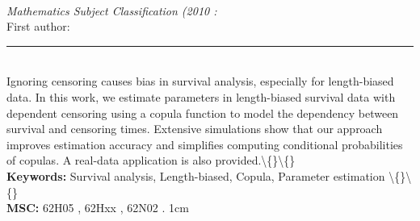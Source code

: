 \documentclass[10pt,twoside]{article}
\begin{document}
\noindent\begin{minipage}[t][\textheight]{\textwidth}
\\[0.35em]
{\itshape Mathematics Subject Classification (2010 :}\\[0.2em]
{\footnotesize First author: }\\[0.45em]
\noindent\rule{\textwidth}{0.3pt}\\[0.4em]
{\footnotesize  Ignoring censoring causes bias in survival analysis, especially for length-biased data. In this work, we estimate parameters in length-biased survival data with dependent censoring using a copula function to model the dependency between survival and censoring times. Extensive simulations show that our approach improves estimation accuracy and simplifies computing conditional probabilities of copulas. A real-data application is also provided.\textbackslash\{\}\textbackslash\{\}}\\[0.4em]
{\footnotesize\bfseries Keywords:} {\footnotesize Survival analysis, Length-biased, Copula, Parameter estimation \textbackslash\{\}\textbackslash\{\}}\\[0.15em]
{\footnotesize\bfseries MSC:} {\footnotesize 62H05 , 62Hxx , 62N02 . 1cm}\\
\vfill
\end{minipage}
\newpage
\end{document}
